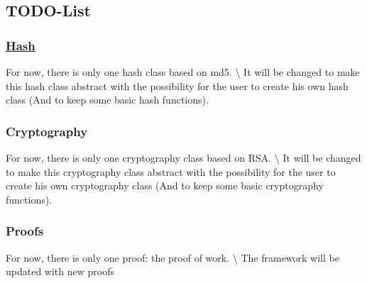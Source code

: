  \subsection*{T\+O\+D\+O-\/\+List}

\subsubsection*{\mbox{\hyperlink{classHash}{Hash}}}

For now, there is only one hash class based on md5. \textbackslash{} It will be changed to make this hash class abstract with the possibility for the user to create his own hash class (And to keep some basic hash functions).

\subsubsection*{Cryptography}

For now, there is only one cryptography class based on R\+SA. \textbackslash{} It will be changed to make this cryptography class abstract with the possibility for the user to create his own cryptography class (And to keep some basic cryptography functions).

\subsubsection*{Proofs}

For now, there is only one proof\+: the proof of work. \textbackslash{} The framework will be updated with new proofs 